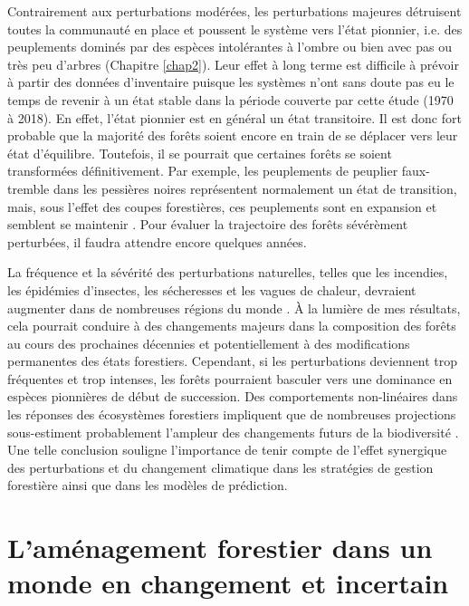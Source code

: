 Contrairement aux perturbations modérées, les perturbations majeures
détruisent toutes la communauté en place et poussent le système vers
l'état pionnier, i.e. des peuplements dominés par des espèces
intolérantes à l'ombre ou bien avec pas ou très peu d'arbres (Chapitre
\ref{chap2}). Leur effet à long terme est difficile à prévoir à partir
des données d'inventaire puisque les systèmes n'ont sans doute pas eu le
temps de revenir à un état stable dans la période couverte par cette
étude (1970 à 2018). En effet, l'état pionnier est en général un état
transitoire. Il est donc fort probable que la majorité des forêts soient
encore en train de se déplacer vers leur état d'équilibre. Toutefois, il
se pourrait que certaines forêts se soient transformées définitivement.
Par exemple, les peuplements de peuplier faux-tremble dans les pessières
noires représentent normalement un état de transition, mais, sous
l'effet des coupes forestières, ces peuplements sont en expansion et
semblent se maintenir \citep{grondin_les_2003}. Pour évaluer la
trajectoire des forêts sévérèment perturbées, il faudra attendre encore
quelques années.

La fréquence et la sévérité des perturbations naturelles, telles que les
incendies, les épidémies d'insectes, les sécheresses et les vagues de
chaleur, devraient augmenter dans de nombreuses régions du monde
\citep{bergeron_past_2006, seidl_forest_2017}. À la lumière de mes
résultats, cela pourrait conduire à des changements majeurs dans la
composition des forêts au cours des prochaines décennies et
potentiellement à des modifications permanentes des états forestiers.
Cependant, si les perturbations deviennent trop fréquentes et trop
intenses, les forêts pourraient basculer vers une dominance en espèces
pionnières de début de succession. Des comportements non-linéaires dans
les réponses des écosystèmes forestiers impliquent que de nombreuses
projections sous-estiment probablement l'ampleur des changements futurs
de la biodiversité \citep{scheffer_catastrophic_2001}. Une telle
conclusion souligne l'importance de tenir compte de l'effet synergique
des perturbations et du changement climatique dans les stratégies de
gestion forestière ainsi que dans les modèles de prédiction.

\hypertarget{lamuxe9nagement-forestier-dans-un-monde-en-changement-et-incertain}{%
\section{L'aménagement forestier dans un monde en changement et
incertain}\label{lamuxe9nagement-forestier-dans-un-monde-en-changement-et-incertain}}

